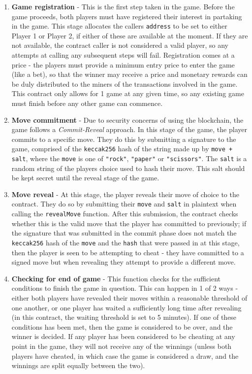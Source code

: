 \documentclass[a4paper, twoside]{article}
\begin{document}
\begin{enumerate}
	\item \textbf{Game registration} - This is the first step taken in the game. Before the game proceeds, both players must have registered their interest in partaking in the game. This stage allocates the callers \texttt{address} to be set to either Player 1 or Player 2, if either of these are available at the moment. If they are not available, the contract caller is not considered a valid player, so any attempts at calling any subsequent steps will fail. Registration comes at a price - the players must provide a minimum entry price to enter the game (like a bet), so that the winner may receive a price and monetary rewards can be duly distributed to the miners of the transactions involved in the game. This contract only allows for 1 game at any given time, so any existing game must finish before any other game can commence.
	
	\item \textbf{Move commitment} - Due to security concerns of using the blockchain, the game follows a \textit{Commit-Reveal} approach. In this stage of the game, the player commits to a specific move. They do this by submitting a signature to the game,  comprised of the \texttt{keccak256} hash of the string made up by \texttt{move + salt}, where the \texttt{move} is one of \texttt{"rock"}, \texttt{"paper"} or \texttt{"scissors"}. The \texttt{salt} is a random string of the players choice used to hash their move. This salt should be kept secret until the reveal stage of the game.
	
	\item \textbf{Move reveal} - At this stage, the player reveals their move of choice to the contract. They do so by submitting their \texttt{move} and \texttt{salt} in plaintext when calling the \texttt{revealMove} function. After this submission, the contract checks whether this is the valid move that the player has committed to previously; if the signature that was submitted in the commit phase does not match the \texttt{keccak256} hash of the \texttt{move} and the \texttt{hash} that were passed in at this stage, then the player is seen to be attempting to cheat - they have committed to a signed move but when revealing they attempt to provide a different move. 
	
	\item \textbf{Checking for end of game} - This function checks for the sufficient conditions to finish the game in question. This can happen in 1 of 2 ways - either both players have revealed their moves within a reasonable threshold of one another, or one player has waited a sufficiently long time after revealing (in this contract, the waiting threshold is set to 5 minutes). If one of these conditions has been met, then the game is considered to be over, and the winner is decided. If any player has been considered to be cheating at any point in the game, they will not receive any of the winnings (unless both players have cheated, in which case the game is considered a draw, and the winnings are split equally between the two). 
\end{enumerate}
\end{document}
